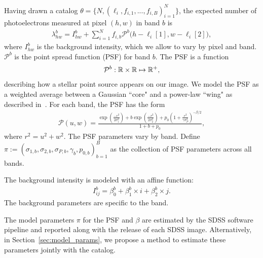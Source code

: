 Having drawn a catalog $\theta = \{N, (\ell_i, f_{i,1}, ..., f_{i,B})_{i = 1}^N\}$,
the expected number of photoelectrons measured at pixel $(h,w)$ in band $b$ is
\begin{align}
  \lambda^b_{hw} = I^{b}_{hw} + \sum_{i = 1}^N f_{i,b} \mathcal{P}^b\big(h - \ell_{i}[1], w - \ell_{i}[2]\big),
  \label{eq:expected_intensity}
\end{align}
where $I^{b}_{hw}$ is the background intensity, which we allow to vary by pixel and band. $\mathcal{P}^b$ is the point spread function (PSF) for band $b$. The PSF
is a function 
\begin{align}
\mathcal{P}^b : \mathbb{R} \times \mathbb{R} \mapsto \mathbb{R}^+,
\end{align}
describing how a stellar point source appears
on our image. We model the PSF as a weighted average between a Gaussian ``core" and a power-law ``wing" as described in~\cite{Xin2018psf}. For each band, the PSF has the form
\begin{align}
    \mathcal{P}(u,w) = \frac{\exp(\frac{-r^2}{2\sigma_1^2}) + 
                            b \exp(\frac{-r^2}{2\sigma_2^2}) + 
                            p_0(1 + \frac{r^2}{\gamma\sigma^2_P})^{-\beta/2} }{1 + b + p_0},
\end{align}
where $r^2 = u^2 + w^2$. The PSF parameters vary by band. Define 
$\pi := (\sigma_{1,b}, \sigma_{2,b}, \sigma_{P,b}, \gamma_b, p_{0,b})_{b=1}^B$ as the collection of PSF parameters across all bands. 

The background intensity is modeled with an affine function: 
\begin{align}
    I_{ij}^{b} = \beta_0^{b} + \beta_1^{b} \times i + \beta_2^{b} \times j.
\end{align}
The background parameters are specific to the band. 

The model parameters $\pi$ for the PSF and $\beta$ are estimated by the SDSS software pipeline and reported along with the release of each SDSS image. Alternatively, in Section~\ref{sec:model_params}, we propose a method to estimate these parameters jointly with the catalog. 

